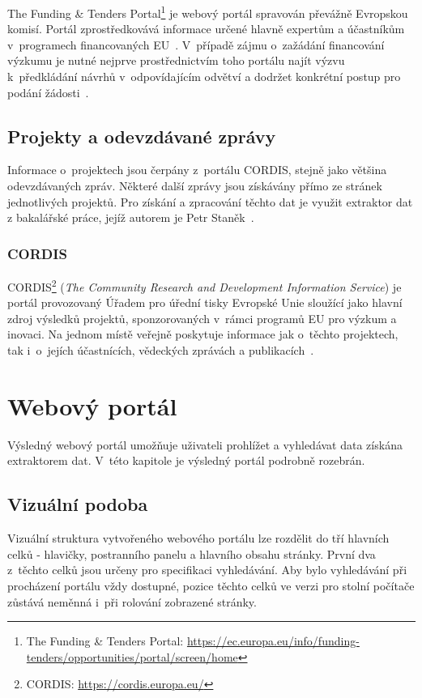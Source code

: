 The Funding \& Tenders Portal\footnote{The Funding \& Tenders Portal: \url{https://ec.europa.eu/info/funding-tenders/opportunities/portal/screen/home}} je webový portál spravován převážně Evropskou komisí. Portál zprostředkovává informace určené hlavně expertům a účastníkům v~programech financovaných EU~\cite{bib:funding-about}.
V~případě zájmu o~zažádání financování výzkumu je nutné nejprve prostřednictvím toho portálu najít výzvu k~předkládání návrhů v~odpovídajícím odvětví a dodržet konkrétní postup pro podání žádosti~\cite{bib:funding-find}.

\subsection{Projekty a odevzdávané zprávy}
Informace o~projektech jsou čerpány z~portálu CORDIS, stejně jako většina odevzdávaných zpráv. Některé další zprávy jsou získávány přímo ze stránek jednotlivých projektů. Pro získání a zpracování těchto dat je využit extraktor dat z bakalářské práce, jejíž autorem je Petr Staněk~\cite{bib:stanek}.

\subsubsection*{CORDIS}
CORDIS\footnote{CORDIS: \url{https://cordis.europa.eu/}} (\emph{The Community Research and Development Information Service}) je portál provozovaný Úřadem pro úřední tisky Evropské Unie sloužící jako hlavní zdroj výsledků projektů, sponzorovaných v~rámci programů EU pro výzkum a inovaci. Na jednom místě veřejně poskytuje informace jak o~těchto projektech, tak i~o~jejích účastnících, vědeckých zprávách a publikacích~\cite{bib:cordis}.



\section{Webový portál}
Výsledný webový portál umožňuje uživateli prohlížet a vyhledávat data získána extraktorem dat. V~této kapitole je výsledný portál podrobně rozebrán.

\subsection{Vizuální podoba}
Vizuální struktura vytvořeného webového portálu lze rozdělit do tří hlavních celků - hlavičky, postranního panelu a hlavního obsahu stránky. První dva z~těchto celků jsou určeny pro specifikaci vyhledávání. Aby bylo vyhledávání při procházení portálu vždy dostupné, pozice těchto celků ve verzi pro stolní počítače zůstává neměnná i~při rolování zobrazené stránky.

